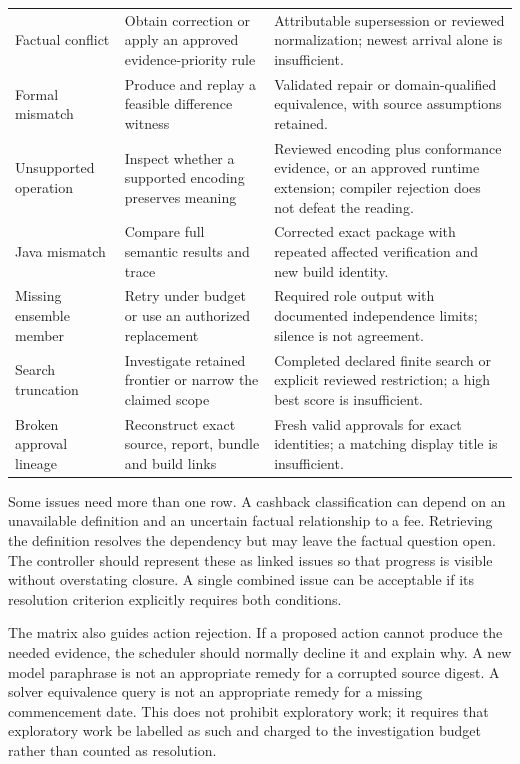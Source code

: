 \documentclass[12pt,a4paper,oneside,openany]{book}
\begin{document}
\begin{longtable}{@{}P{27mm}P{56mm}P{65mm}@{}}
Factual conflict & Obtain correction or apply an approved evidence-priority rule & Attributable supersession or reviewed normalization; newest arrival alone is insufficient.\\
Formal mismatch & Produce and replay a feasible difference witness & Validated repair or domain-qualified equivalence, with source assumptions retained.\\
Unsupported operation & Inspect whether a supported encoding preserves meaning & Reviewed encoding plus conformance evidence, or an approved runtime extension; compiler rejection does not defeat the reading.\\
Java mismatch & Compare full semantic results and trace & Corrected exact package with repeated affected verification and new build identity.\\
Missing ensemble member & Retry under budget or use an authorized replacement & Required role output with documented independence limits; silence is not agreement.\\
Search truncation & Investigate retained frontier or narrow the claimed scope & Completed declared finite search or explicit reviewed restriction; a high best score is insufficient.\\
Broken approval lineage & Reconstruct exact source, report, bundle and build links & Fresh valid approvals for exact identities; a matching display title is insufficient.\\
\bottomrule
\end{longtable}

Some issues need more than one row. A cashback classification can depend on an
unavailable definition and an uncertain factual relationship to a fee. Retrieving
the definition resolves the dependency but may leave the factual question open.
The controller should represent these as linked issues so that progress is visible
without overstating closure. A single combined issue can be acceptable if its
resolution criterion explicitly requires both conditions.

The matrix also guides action rejection. If a proposed action cannot produce the
needed evidence, the scheduler should normally decline it and explain why. A new
model paraphrase is not an appropriate remedy for a corrupted source digest. A
solver equivalence query is not an appropriate remedy for a missing commencement
date. This does not prohibit exploratory work; it requires that exploratory work
be labelled as such and charged to the investigation budget rather than counted
as resolution.
\end{document}
